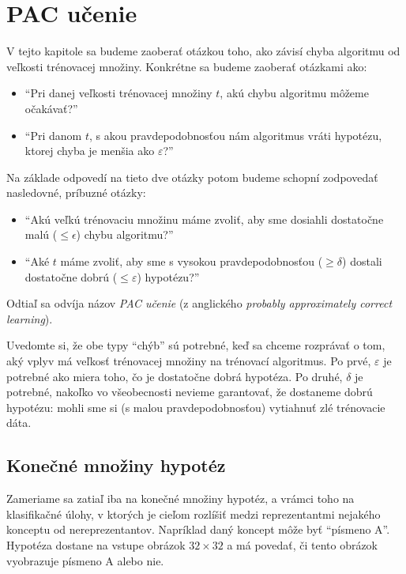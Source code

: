 \chapter{PAC učenie}

V tejto kapitole sa budeme zaoberať otázkou toho, ako závisí chyba
algoritmu od veľkosti trénovacej množiny. Konkrétne sa budeme
zaoberať otázkami ako:
\begin{itemize}
  \item ``Pri danej veľkosti trénovacej množiny $t$, akú chybu algoritmu
    môžeme očakávať?''
  \item ``Pri danom $t$, s akou pravdepodobnosťou nám algoritmus vráti
    hypotézu, ktorej chyba je menšia ako $\varepsilon$?''
\end{itemize}
Na základe odpovedí na tieto dve otázky potom budeme schopní zodpovedať
nasledovné, príbuzné otázky:
\begin{itemize}
  \item ``Akú veľkú trénovaciu množinu máme zvoliť, aby sme dosiahli
    dostatočne malú ($\leq \epsilon$) chybu algoritmu?''
  \item ``Aké $t$ máme zvoliť, aby sme s vysokou pravdepodobnosťou
    ($\geq \delta$) dostali dostatočne dobrú ($\leq \varepsilon$)
    hypotézu?''
\end{itemize}

Odtiaľ sa odvíja názov \emph{PAC učenie} (z anglického
\emph{probably approximately correct learning}).

Uvedomte si, že obe typy ``chýb'' sú potrebné, keď sa chceme rozprávať
o tom, aký vplyv má veľkosť trénovacej množiny na trénovací algoritmus.
Po prvé, $\varepsilon$ je potrebné ako miera toho, čo je dostatočne
dobrá hypotéza. Po druhé, $\delta$ je potrebné, nakoľko vo všeobecnosti
nevieme garantovať, že dostaneme dobrú hypotézu: mohli sme si
(s malou pravdepodobnosťou) vytiahnuť zlé trénovacie dáta.




\section{Konečné množiny hypotéz}

Zameriame sa zatiaľ iba na konečné množiny hypotéz, a vrámci toho
na klasifikačné úlohy, v ktorých je cieľom rozlíšiť medzi
reprezentantmi nejakého konceptu od nereprezentantov.
Napríklad daný koncept môže byť ``písmeno A''. Hypotéza dostane na
vstupe obrázok $32 \times 32$ a má povedať, či tento obrázok vyobrazuje
písmeno A alebo nie.

